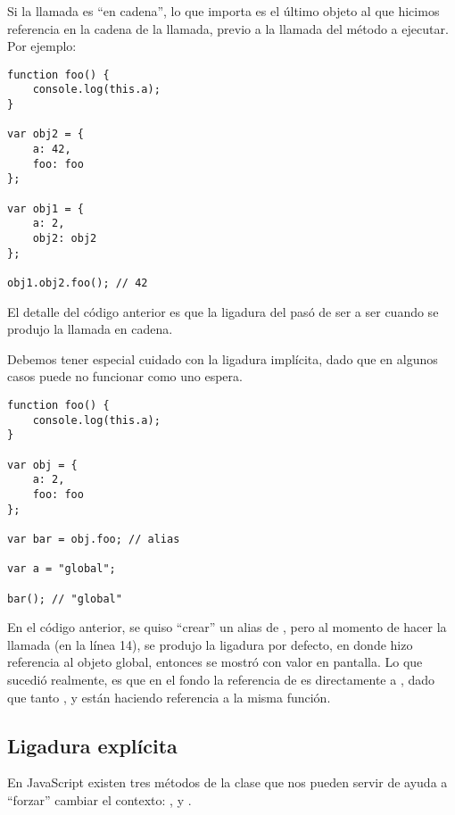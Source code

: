 Si la llamada es "`en cadena"', lo que importa es el último objeto al que hicimos referencia en la cadena de la llamada, previo a la llamada del método a ejecutar. Por ejemplo:

\begin{lstlisting}
function foo() {
	console.log(this.a);
}

var obj2 = {
	a: 42,
	foo: foo
};

var obj1 = {
	a: 2,
	obj2: obj2
};

obj1.obj2.foo(); // 42
\end{lstlisting}

El detalle del código anterior es que la ligadura del  pasó de ser  a ser  cuando se produjo la llamada en cadena.

Debemos tener especial cuidado con la ligadura implícita, dado que en algunos casos puede no funcionar como uno espera.

\begin{lstlisting}
function foo() {
	console.log(this.a);
}

var obj = {
	a: 2,
	foo: foo
};

var bar = obj.foo; // alias

var a = "global";

bar(); // "global"
\end{lstlisting}

En el código anterior, se quiso "`crear"'  un alias de , pero al momento de hacer la llamada (en la línea 14), se produjo la ligadura por defecto, en donde  hizo referencia al objeto global, entonces se mostró  con valor  en pantalla. Lo que sucedió realmente, es que en el fondo la referencia de  es directamente a , dado que tanto ,  y  están haciendo referencia a la misma función.

\subsection{Ligadura explícita}
\label{subsec:ligaduraexplicita}

En JavaScript existen tres métodos de la clase  que nos pueden servir de ayuda a "`forzar"' cambiar el contexto: ,  y .


